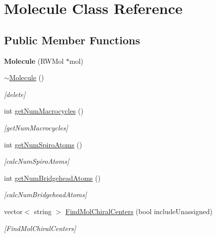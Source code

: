 \hypertarget{class_molecule}{}\section{Molecule Class Reference}
\label{class_molecule}
\subsection*{Public Member Functions}
\begin{DoxyCompactItemize}
\item 
\hypertarget{class_molecule_a552677256bff6acac003617eddaa4233}{}{\bfseries Molecule} (R\+W\+Mol $\ast$mol)\label{class_molecule_a552677256bff6acac003617eddaa4233}

\item 
\hyperlink{class_molecule_a1ff980b574a62526abff3d631c83bf94}{$\sim$\+Molecule} ()
\begin{DoxyCompactList}\small\item\em \mbox{[}delete\mbox{]} \end{DoxyCompactList}\item 
int \hyperlink{class_molecule_a7ae4c6e9458d7874bf43bdfbe079d875}{get\+Num\+Macrocycles} ()
\begin{DoxyCompactList}\small\item\em \mbox{[}get\+Num\+Macrocycles\mbox{]} \end{DoxyCompactList}\item 
int \hyperlink{class_molecule_ab418ce9c2222f00552c847a14499e282}{get\+Num\+Spiro\+Atoms} ()
\begin{DoxyCompactList}\small\item\em \mbox{[}calc\+Num\+Spiro\+Atoms\mbox{]} \end{DoxyCompactList}\item 
int \hyperlink{class_molecule_a9d22135d69888e8d269ac5384a424f83}{get\+Num\+Bridgehead\+Atoms} ()
\begin{DoxyCompactList}\small\item\em \mbox{[}calc\+Num\+Bridgehead\+Atoms\mbox{]} \end{DoxyCompactList}\item 
vector$<$ string $>$ \hyperlink{class_molecule_a9befce09a7221276f628c79d28d6758f}{Find\+Mol\+Chiral\+Centers} (bool include\+Unassigned)
\begin{DoxyCompactList}\small\item\em \mbox{[}Find\+Mol\+Chiral\+Centers\mbox{]} \end{DoxyCompactList}\item 

\end{DoxyCompactItemize}
